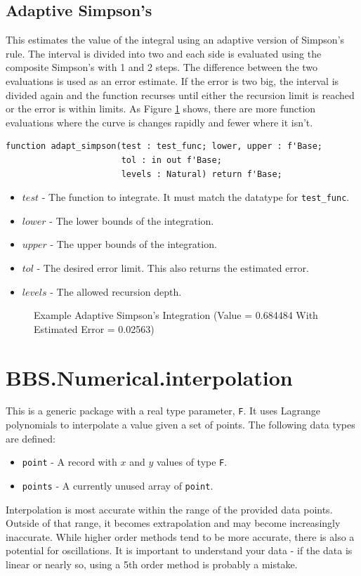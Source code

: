 \documentclass[10pt, openany]{book}
\newcommand{\indexfunc}[1]{\index[func]{#1}}
\newcommand{\datatype}[1]{\texttt{#1}}
\begin{document}
\subsection{Adaptive Simpson's}
This estimates the value of the integral using an adaptive version of Simpson's rule.  The interval is divided into two and each side is evaluated using the composite Simpson's with 1 and 2 steps.  The difference between the two evaluations is used as an error estimate.  If the error is two big, the interval is divided again and the function recurses until either the recursion limit is reached or the error is within limits.  As Figure \ref{tex:AdaptSimp} shows, there are more function evaluations where the curve is changes rapidly and fewer where it isn't.
\begin{lstlisting}
function adapt_simpson(test : test_func; lower, upper : f'Base;
                       tol : in out f'Base;
                       levels : Natural) return f'Base;
\end{lstlisting}
\indexfunc{integ-adapt\_simpson}
\begin{itemize}
  \item $test$ - The function to integrate.  It must match the datatype for \datatype{test\_func}.
  \item $lower$ - The lower bounds of the integration.
  \item $upper$ - The upper bounds of the integration.
  \item $tol$ - The desired error limit.  This also returns the estimated error.
  \item $levels$ - The allowed recursion depth.
\end{itemize}

\begin{figure}
  
  \caption{Example Adaptive Simpson's Integration (Value = 0.684484 With Estimated Error = 0.02563)}
  \label{tex:AdaptSimp}
\end{figure}

\section{BBS.Numerical.interpolation}
This is a generic package with a real type parameter, \datatype{F}.  It uses Lagrange polynomials to interpolate a value given a set of points.  The following data types are defined:
\begin{itemize}
  \item \datatype{point} - A record with $x$ and $y$ values of type \datatype{F}.
  \item \datatype{points} - A currently unused array of \datatype{point}.
\end{itemize}
Interpolation is most accurate within the range of the provided data points.  Outside of that range, it becomes extrapolation and may become increasingly inaccurate.  While higher order methods tend to be more accurate, there is also a potential for oscillations.  It is important to understand your data - if the data is linear or nearly so, using a 5th order method is probably a mistake.
\end{document}

